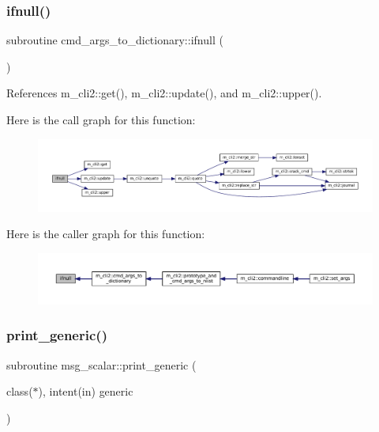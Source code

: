 \subsubsection{\texorpdfstring{ifnull()}{ifnull()}}
{\footnotesize\ttfamily subroutine cmd\+\_\+args\+\_\+to\+\_\+dictionary\+::ifnull (\begin{DoxyParamCaption}{ }\end{DoxyParamCaption})\hspace{0.3cm}{\ttfamily [private]}}



References m\+\_\+cli2\+::get(), m\+\_\+cli2\+::update(), and m\+\_\+cli2\+::upper().

Here is the call graph for this function\+:\nopagebreak
\begin{figure}[H]
\begin{center}
\leavevmode
\includegraphics[width=350pt]{M__CLI2_8f90_aa26f90016621d1ee43d3b5b66316532b_cgraph}
\end{center}
\end{figure}
Here is the caller graph for this function\+:\nopagebreak
\begin{figure}[H]
\begin{center}
\leavevmode
\includegraphics[width=350pt]{M__CLI2_8f90_aa26f90016621d1ee43d3b5b66316532b_icgraph}
\end{center}
\end{figure}
\mbox{\label{M__CLI2_8f90_aaa8ee15f943d8e1543ae35ab732c3cd2}} 
\subsubsection{\texorpdfstring{print\+\_\+generic()}{print\_generic()}\hspace{0.1cm}{\footnotesize\ttfamily [1/2]}}
{\footnotesize\ttfamily subroutine msg\+\_\+scalar\+::print\+\_\+generic (\begin{DoxyParamCaption}\item[{class($\ast$), intent(in)}]{generic }\end{DoxyParamCaption})\hspace{0.3cm}{\ttfamily [private]}}

